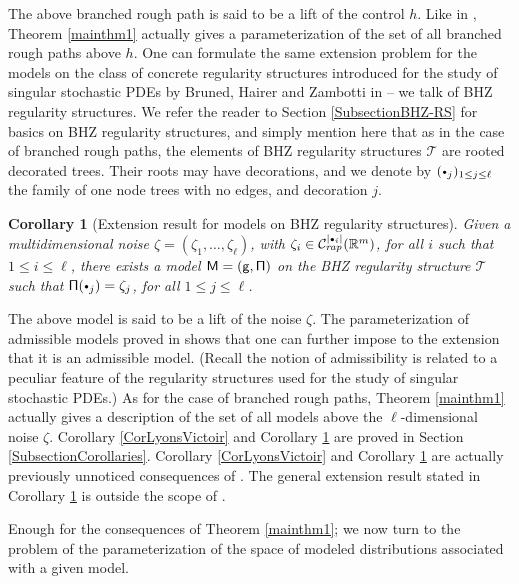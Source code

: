 \documentclass[10pt]{amsart}
\newcommand{\sbullet}{{\scriptscriptstyle\bullet}}
\newcommand{\scbullet}{{\raisebox{1pt}{$\sbullet$}}}
\theoremstyle{plain}
\newtheorem{cor}[thm]{Corollary}
\theoremstyle{definition}
\newcommand{\bbR}{\mathbb{R}}
\newcommand{\mcC}{\mathcal{C}}
\begin{document}
The above branched rough path is said to be a lift of the control $h$. Like in \cite{TZ18}, Theorem \ref{mainthm1} actually gives a parameterization of the set of all branched rough paths above $h$. One can formulate the same extension problem for the models on the class of concrete regularity structures introduced for the study of singular stochastic PDEs by Bruned, Hairer and Zambotti in \cite{BHZ} -- we talk of BHZ regularity structures. We refer the reader to Section \ref{SubsectionBHZ-RS} for basics on BHZ regularity structures, and simply mention here that as in the case of branched rough paths, the elements of BHZ regularity structures $\mathscr{T}$ are rooted decorated trees. Their roots may have decorations, and we denote by $(\scbullet_j)_{1\leq j\leq \ell}$ the family of one node trees with no edges, and decoration $j$.

\begin{cor}[Extension result for models on BHZ regularity structures] \label{CorExtension}
Given a multidimensional noise $\zeta=(\zeta_1,\dots,\zeta_\ell)$, with $\zeta_i\in \mcC^{\vert\sbullet_i\vert}_\textrm{\emph{rap}}(\bbR^m)$, for all $i$ such that $1\leq i\leq\ell$, there exists a model $\sf M=(g,\Pi)$ on the BHZ regularity structure $\mathscr{T}$ such that ${\sf \Pi}(\scbullet_j)=\zeta_j$, for all $1\leq j\leq\ell$.
\end{cor}

The above model is said to be a lift of the noise $\zeta$. The parameterization of admissible models proved in \cite{BH} shows that one can further impose to the extension that it is an admissible model. (Recall the notion of admissibility is related to a peculiar feature of the regularity structures used for the study of singular stochastic PDEs.) As for the case of branched rough paths, Theorem \ref{mainthm1} actually gives a description of the set of all models above the $\ell$-dimensional noise $\zeta$. Corollary \ref{CorLyonsVictoir} and Corollary \ref{CorExtension} are proved in Section \ref{SubsectionCorollaries}. Corollary \ref{CorLyonsVictoir} and Corollary \ref{CorExtension} are actually previously unnoticed consequences of \cite[Th.\,21]{BH}. The general extension result stated in Corollary \ref{CorExtension} is outside the scope of \cite[Th.\,21]{BH}.

Enough for the consequences of Theorem \ref{mainthm1}; we now turn to the problem of the parameterization of the space of modeled distributions associated with a given model.
\end{document}
